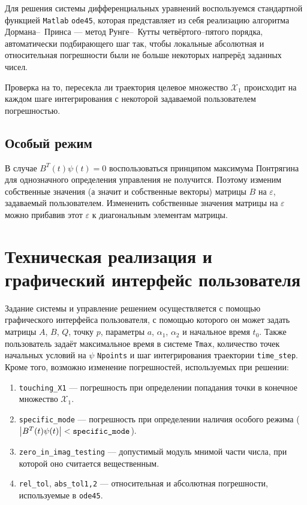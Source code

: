 \documentclass[11pt]{article}
\newcommand*{\hm}[1]{#1\nobreak\discretionary{}{\hbox{$\mathsurround=0pt #1$}}{}}
\newcommand\abs[1]{\left\lvert#1\right\rvert}
\begin{document}
Для решения системы дифференциальных уравнений воспользуемся стандартной функцией \texttt{Matlab} \texttt{ode45}, которая представляет из себя реализацию алгоритма Дормана--~Принса --- метод Рунге--~Кутты четвёртого--пятого порядка, автоматически подбирающего шаг так, чтобы локальные абсолютная и относительная погрешности были не больше некоторых напрерёд заданных чисел.

Проверка на то, пересекла ли траектория целевое множество $\mathcal{X}_1$ происходит на каждом шаге интегрирования с некоторой задаваемой пользователем погрешностью.
\subsection{Особый режим}
В случае $B^T(t)\psi(t) = 0$ воспользоваться принципом максимума Понтрягина для однозначного определения управления не получится. Поэтому изменим собственные значения (а значит и собственные векторы) матрицы $B$ на $\varepsilon$, задаваемый пользователем. Измененить собственные значения матрицы на $\varepsilon$ можно прибавив этот $\varepsilon$ к диагональным элементам матрицы.
\section{Техническая реализация и графический интерфейс пользователя}
Задание системы и управление решением осуществляется с помощью графического интерфейса пользователя, с помощью которого он может задать матрицы $A$, $B$, $Q$, точку $p$, параметры $a$, $\alpha_1$, $\alpha_2$ и начальное время $t_0$. Также пользователь задаёт максимальное время в системе \texttt{Tmax}, количество точек начальных условий на $\psi$ \texttt{Npoints} и шаг интегрирования траектории \texttt{time\_step}. Кроме того, возможно изменение погрешностей, используемых при решении:
\begin{enumerate}
\item
\texttt{touching\_X1} --- погрешность при определении попадания точки в конечное множество $\mathcal{X}_1$.
\item
\texttt{specific\_mode} --- погрешность при определении наличия особого режима ($\abs{B^T(t)\psi(t)} \hm< \texttt{specific\_mode}$).
\item
\texttt{zero\_in\_imag\_testing} --- допустимый модуль мнимой части числа, при которой оно считается вещественным.
\item
\texttt{rel\_tol}, \texttt{abs\_tol1,2} --- относительная и абсолютная погрешности, используемые в \texttt{ode45}.
\end{enumerate}
\end{document}
